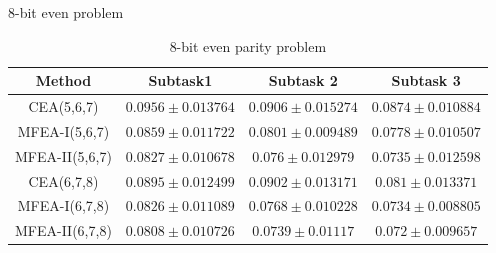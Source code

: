     \begin{frame}{8-bit even problem}
    \begin{table} [H]
        \caption{8-bit even parity problem}
        \begin{center}
        \begin{tabular}{|c|c|c|c|}
        \hline
        \multirow{1}{*}{\textbf{Method}} & \multicolumn{1}{c|}{\textbf{Subtask1}} & \multicolumn{1}{c|}{\textbf{Subtask 2}} & \multicolumn{1}{c|}{\textbf{Subtask 3}} \\ \hline
        CEA(5,6,7) & $0.0956 \pm 0.013764$ & $0.0906 \pm 0.015274$ & $0.0874 \pm 0.010884$ \\
        MFEA-I(5,6,7) & $0.0859 \pm 0.011722$ & $0.0801 \pm 0.009489$ & $0.0778 \pm 0.010507$  \\
        MFEA-II(5,6,7) & $\mathbf{0.0827 \pm 0.010678}$ & $\mathbf{0.076 \pm 0.012979}$ & $\mathbf{0.0735 \pm 0.012598}$ \\\hline
        
        CEA(6,7,8)& $0.0895 \pm 0.012499$ & $0.0902 \pm 0.013171$ & $0.081 \pm 0.013371$ \\
        MFEA-I(6,7,8)  & $0.0826 \pm 0.011089$ & $0.0768 \pm 0.010228$ & $0.0734 \pm 0.008805$ \\
        MFEA-II(6,7,8) & $\mathbf{0.0808 \pm 0.010726}$ & $\mathbf{0.0739 \pm 0.01117}$ & $\mathbf{0.072 \pm 0.009657}$ \\\hline
        \end{tabular}
        \end{center}
        
        \label{tab:result:nbit}
    \end{table}
    \end{frame}
